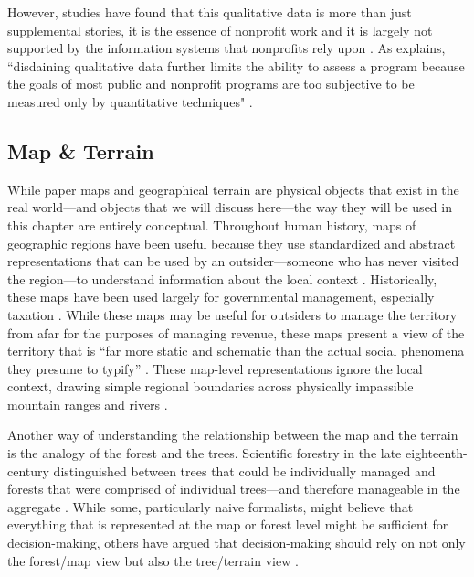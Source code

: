 However, studies have found that this qualitative data is more than just supplemental stories, it is the essence of nonprofit work and it is largely not supported by the information systems that nonprofits rely upon \citep{Marshall2016Accountable,Thomas2016Outcome,Verma2016DrillDown}. As \citet{Thomas2016Outcome} explains, ``disdaining qualitative data further limits the ability to assess a program because the goals of most public and nonprofit programs are too subjective to be measured only by quantitative techniques" \citep{Thomas2016Outcome}.

\subsection{Map \& Terrain}
While paper maps and geographical terrain are physical objects that exist in the real world---and objects that we will discuss here---the way they will be used in this chapter are entirely conceptual. Throughout human history, maps of geographic regions have been useful because they use standardized and abstract representations that can be used by an outsider---someone who has never visited the region---to understand information about the local context \citep{Scott1998Seeing,Porter1995Trust}. Historically, these maps have been used largely for governmental management, especially taxation \citep{Scott1998Seeing}. While these maps may be useful for outsiders to manage the territory from afar for the purposes of managing revenue, these maps present a view of the territory that is ``far more static and schematic than the actual social phenomena they presume to typify'' \citep{Scott1998Seeing}. These map-level representations ignore the local context, drawing simple regional boundaries across physically impassible mountain ranges and rivers \citep{Scott1998Seeing}.

Another way of understanding the relationship between the map and the terrain is the analogy of the forest and the trees. Scientific forestry in the late eighteenth-century distinguished between trees that could be individually managed and forests that were comprised of individual trees---and therefore manageable in the aggregate \citep{Porter1995Trust}. While some, particularly naive formalists, might believe that everything that is represented at the map or forest level might be sufficient for decision-making, others have argued that decision-making should rely on not only the forest/map view but also the tree/terrain view \citep{Berg1997OfForms}.

